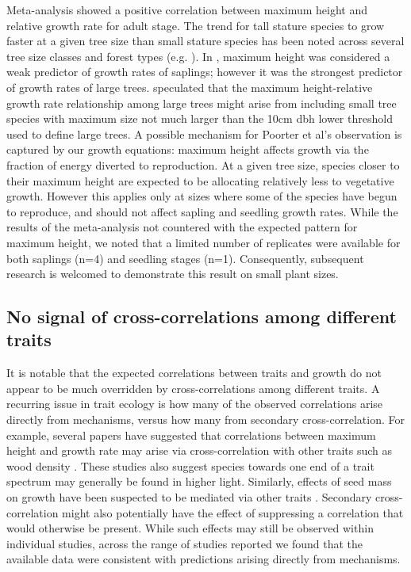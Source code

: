\documentclass[a4paper,11pt]{article}
\begin{document}
Meta-analysis showed a positive correlation between maximum height and relative growth rate for adult stage. The trend for tall stature species to grow faster at a given tree size than small stature species has been noted across several tree size classes and forest types (e.g. \citealt{Thomas:1996do,Poorter:2008iu,Wright:2010tp,Herault:2011dd,Ruger:2012jv,Iida:2014ep}). In \citet{Wright:2010tp}, maximum height was considered a weak predictor of growth rates of saplings; however it was the strongest predictor of growth rates of large trees. \citet{Poorter:2008iu} speculated that the maximum height-relative growth rate relationship among large trees might arise from including small tree species with maximum size not much larger than the 10cm dbh lower threshold used to define large trees. A possible mechanism for Poorter et al's observation is captured by our growth equations: maximum height affects growth via the fraction of energy diverted to reproduction. At a given tree size, species closer to their maximum height are expected to be allocating relatively less to vegetative growth. However this applies only at sizes where some of the species have begun to reproduce, and should not affect sapling and seedling growth rates. While the results of the meta-analysis not countered with the expected pattern for maximum height, we noted that a limited number of replicates were available for both saplings (n=4) and seedling stages (n=1). Consequently, subsequent research is welcomed to demonstrate this result on small plant sizes.

\subsection*{No signal of cross-correlations among different traits}

It is notable that the expected correlations between traits and growth do not appear to be much overridden by cross-correlations among different traits. A recurring issue in trait ecology is how many of the observed correlations arise directly from mechanisms, versus how many from secondary cross-correlation. For example, several papers have suggested that correlations between maximum height and growth rate may arise via cross-correlation with other traits such as wood density \citep{Thomas:1996do, Poorter:2006vb, Wright:2010tp}. These studies also suggest species towards one end of a trait spectrum may generally be found in higher light. Similarly, effects of seed mass on growth have been suspected to be mediated via other traits \citep{Shipley:1990js,Westoby:2002ft,Poorter:2006vb}. Secondary cross-correlation might also potentially have the effect of suppressing a correlation that would otherwise be present. While such effects may still be observed within individual studies, across the range of studies reported we found that the available data were consistent with predictions arising directly from mechanisms.
\end{document}
